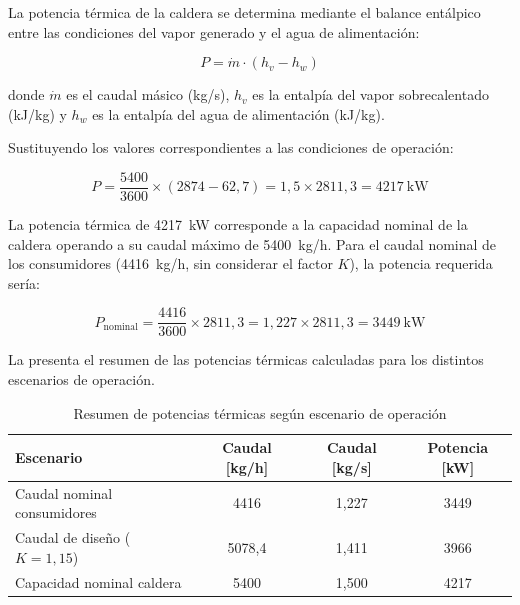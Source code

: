 La potencia térmica de la caldera se determina mediante el balance entálpico entre las condiciones del vapor generado y el agua de alimentación:

\begin{equation}
	P = \dot{m} \cdot (h_v - h_w)
	\label{eq:potencia-termica-caldera}
\end{equation}

\noindent donde $\dot{m}$ es el caudal másico (kg/s), $h_v$ es la entalpía del vapor sobrecalentado (kJ/kg) y $h_w$ es la entalpía del agua de alimentación (kJ/kg).

Sustituyendo los valores correspondientes a las condiciones de operación:

\begin{equation}
	P = \frac{5400}{3600} \times (2874 - 62{,}7) = 1{,}5 \times 2811{,}3 = 4217 \ \text{kW}
	\label{eq:potencia-caldera-calculada}
\end{equation}

La potencia térmica de 4217~kW corresponde a la capacidad nominal de la caldera operando a su caudal máximo de 5400~kg/h. Para el caudal nominal de los consumidores (4416~kg/h, sin considerar el factor $K$), la potencia requerida sería:

\begin{equation}
	P_{\text{nominal}} = \frac{4416}{3600} \times 2811{,}3 = 1{,}227 \times 2811{,}3 = 3449 \ \text{kW}
	\label{eq:potencia-nominal-consumidores}
\end{equation}

La  presenta el resumen de las potencias térmicas calculadas para los distintos escenarios de operación.

\begin{table}[H]
	\centering
	\caption{Resumen de potencias térmicas según escenario de operación}
	\label{tab:resumen-potencias-caldera}
	\begin{tabular}{lccc}
		\toprule
		\textbf{Escenario}            & \textbf{Caudal [kg/h]} & \textbf{Caudal [kg/s]} & \textbf{Potencia [kW]} \\
		\midrule
		Caudal nominal consumidores   & 4416                   & 1,227                  & 3449                   \\
		Caudal de diseño ($K=1{,}15$) & 5078,4                 & 1,411                  & 3966                   \\
		Capacidad nominal caldera     & 5400                   & 1,500                  & 4217                   \\
		\bottomrule
	\end{tabular}
\end{table}

